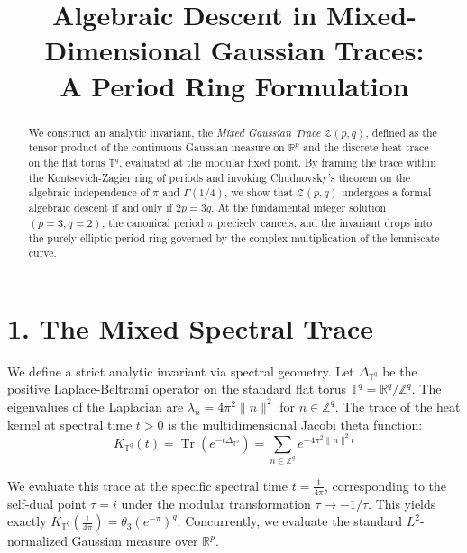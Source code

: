 \documentclass[12pt]{article}
\begin{document}
\title{\textbf{Algebraic Descent in Mixed-Dimensional Gaussian Traces: \\ A Period Ring Formulation}}
\author{}
\date{}
\maketitle

\begin{abstract}
\noindent We construct an analytic invariant, the \textit{Mixed Gaussian Trace} $\mathcal{Z}(p, q)$, defined as the tensor product of the continuous Gaussian measure on $\mathbb{R}^p$ and the discrete heat trace on the flat torus $\mathbb{T}^q$, evaluated at the modular fixed point. By framing the trace within the Kontsevich-Zagier ring of periods and invoking Chudnovsky's theorem on the algebraic independence of $\pi$ and $\Gamma(1/4)$, we show that $\mathcal{Z}(p, q)$ undergoes a formal algebraic descent if and only if $2p = 3q$. At the fundamental integer solution $(p=3, q=2)$, the canonical period $\pi$ precisely cancels, and the invariant drops into the purely elliptic period ring governed by the complex multiplication of the lemniscate curve.
\end{abstract}

\vspace{0.5cm}

\section*{1. The Mixed Spectral Trace}
We define a strict analytic invariant via spectral geometry. Let $\Delta_{\mathbb{T}^q}$ be the positive Laplace-Beltrami operator on the standard flat torus $\mathbb{T}^q = \mathbb{R}^q / \mathbb{Z}^q$. The eigenvalues of the Laplacian are $\lambda_n = 4\pi^2 \|n\|^2$ for $n \in \mathbb{Z}^q$. The trace of the heat kernel at spectral time $t > 0$ is the multidimensional Jacobi theta function:
\begin{equation}
    K_{\mathbb{T}^q}(t) = \operatorname{Tr}\left(e^{-t\Delta_{\mathbb{T}^q}}\right) = \sum_{n \in \mathbb{Z}^q} e^{-4\pi^2 \|n\|^2 t}
\end{equation}

We evaluate this trace at the specific spectral time $t = \frac{1}{4\pi}$, corresponding to the self-dual point $\tau = i$ under the modular transformation $\tau \mapsto -1/\tau$. This yields exactly $K_{\mathbb{T}^q}\left(\frac{1}{4\pi}\right) = \theta_3(e^{-\pi})^q$. Concurrently, we evaluate the standard $L^2$-normalized Gaussian measure over $\mathbb{R}^p$.
\end{document}

